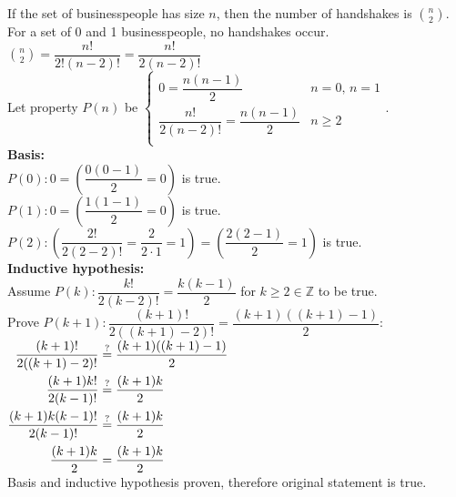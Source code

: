 \documentclass[letterpaper,fleqn,leqno]{article}
\begin{document}
\begin{enumerate}[(a)]
{			If the set of businesspeople has size $n$, then the number of handshakes is $\displaystyle \binom{n}{2}$. \\
			For a set of 0 and 1 businesspeople, no handshakes occur. \\
			$\displaystyle \binom{n}{2}=\dfrac{n!}{2!(n-2)!}=\dfrac{n!}{2(n-2)!}$ \\
			Let property $P(n)$ be $\begin{cases}
				0=\dfrac{n(n-1)}{2} & n=0,\, n=1 \\
				\dfrac{n!}{2(n-2)!}=\dfrac{n(n-1)}{2} & n\geq2 \\
			\end{cases}$. \\
			\textbf{Basis:} \\
			$P(0):0=\left(\dfrac{0(0-1)}{2}=0\right)$ is true. \\
			$P(1):0=\left(\dfrac{1(1-1)}{2}=0\right)$ is true. \\
			$P(2): \left(\dfrac{2!}{2(2-2)!}=\dfrac{2}{2\cdot1}=1\right)=\left(\dfrac{2(2-1)}{2}=1\right)$ is true. \\
			\textbf{Inductive hypothesis:} \\
			Assume $P(k): \dfrac{k!}{2(k-2)!}=\dfrac{k(k-1)}{2}$ for $k\geq2\in\mathbb{Z}$ to be true. \\
			Prove $P(k+1): \dfrac{(k+1)!}{2((k+1)-2)!}=\dfrac{(k+1)((k+1)-1)}{2}$: \\
			$\begin{aligned}[t]
				\dfrac{(k+1)!}{2((k+1)-2)!} &\stackrel{?}{=} \dfrac{(k+1)((k+1)-1)}{2} \\
				\dfrac{(k+1)k!}{2(k-1)!} &\stackrel{?}{=} \dfrac{(k+1)k}{2} \\
				\dfrac{(k+1)k(k-1)!}{2(k-1)!} &\stackrel{?}{=} \dfrac{(k+1)k}{2} \\
				\dfrac{(k+1)k}{2} &= \dfrac{(k+1)k}{2} \\
			\end{aligned}$ \\
			Basis and inductive hypothesis proven, therefore original statement is true. \\
		}
\end{enumerate}
\end{document}

